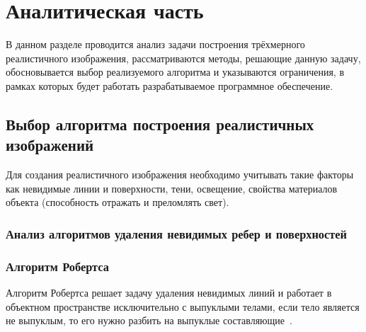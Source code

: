 \chapter{Аналитическая часть}


В данном разделе проводится анализ задачи построения трёхмерного реалистичного изображения, рассматриваются методы, решающие данную задачу, обосновывается выбор реализуемого алгоритма и указываются ограничения, в рамках которых будет работать разрабатываемое программное обеспечение.


\section{Выбор алгоритма построения реалистичных изображений}

Для создания реалистичного изображения необходимо учитывать такие факторы как невидимые линии и поверхности, тени, освещение, свойства материалов объекта (способность отражать и преломлять свет).


\subsection{Анализ алгоритмов удаления невидимых ребер и поверхностей}
\subsection*{Алгоритм Робертса}

Алгоритм Робертса решает задачу удаления невидимых линий и работает в объектном пространстве исключительно с выпуклыми телами, если тело является не выпуклым, то его нужно разбить на выпуклые составляющие~\cite{rodgersCG}.

